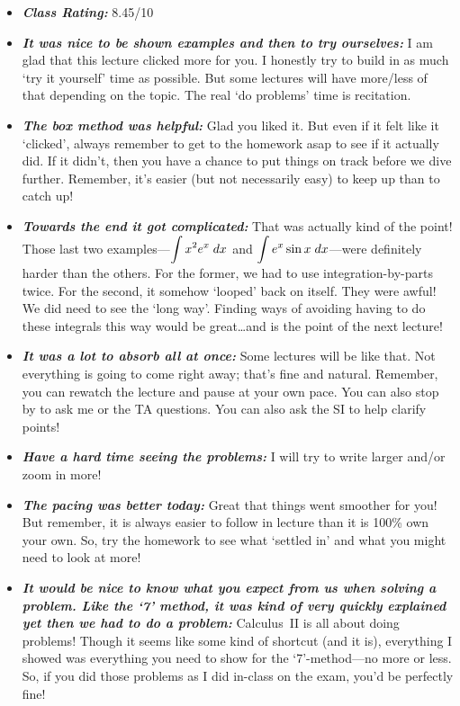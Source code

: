 \documentclass[11pt,letterpaper]{article}
\begin{document}
\begin{itemize}
\item {\bfseries\itshape Class Rating:} 8.45/10

\item {\bfseries\itshape It was nice to be shown examples and then to try ourselves:} I am glad that this lecture clicked more for you. I honestly try to build in as much `try it yourself' time as possible. But some lectures will have more/less of that depending on the topic. The real `do problems' time is recitation. 

\item {\bfseries\itshape The box method was helpful:} Glad you liked it. But even if it felt like it `clicked', always remember to get to the homework asap to see if it actually did. If it didn't, then you have a chance to put things on track before we dive further. Remember, it's easier (but not necessarily easy) to keep up than to catch up!

\item {\bfseries\itshape Towards the end it got complicated:} That was actually kind of the point! Those last two examples---$\displaystyle\int x^2 e^x \;dx$ and $\displaystyle\int e^x \sin x \;dx$---were definitely harder than the others. For the former, we had to use integration-by-parts twice. For the second, it somehow `looped' back on itself. They were awful! We did need to see the `long way'. Finding ways of avoiding having to do these integrals this way would be great\dots and is the point of the next lecture! 

\item {\bfseries\itshape It was a lot to absorb all at once:} Some lectures will be like that. Not everything is going to come right away; that's fine and natural. Remember, you can rewatch the lecture and pause at your own pace. You can also stop by to ask me or the TA questions. You can also ask the SI to help clarify points!

\item {\bfseries\itshape Have a hard time seeing the problems:} I will try to write larger and/or zoom in more!

\item {\bfseries\itshape The pacing was better today:} Great that things went smoother for you! But remember, it is always easier to follow in lecture than it is 100\% own your own. So, try the homework to see what `settled in' and what you might need to look at more!

\item {\bfseries\itshape It would be nice to know what you expect from us when solving a problem. Like the `7' method, it was kind of very quickly explained yet then we had to do a problem:} Calculus~II is all about doing problems! Though it seems like some kind of shortcut (and it is), everything I showed was everything you need to show for the `7'-method---no more or less. So, if you did those problems as I did in-class on the exam, you'd be perfectly fine!


\end{itemize}
\end{document}
